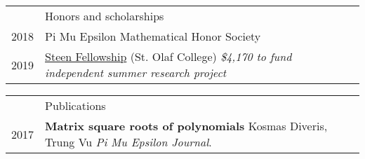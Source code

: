 \documentclass[letterpaper, 11pt]{article}
\newcommand{\headingfont}{\Large\color{Red}}
\newenvironment{SectionTable}[1]{
	\renewcommand*{\arraystretch}{1.7}
	\setlength{\tabcolsep}{10pt}
	\begin{longtable}{Rp{5.2in}} & #1 \\}
	{\end{longtable}\vspace{-.3cm}}
\newenvironment{SectionTableSingleSpace}[1]{
	\renewcommand*{\arraystretch}{1.2}
	\setlength{\tabcolsep}{10pt}
	\begin{longtable}{Rp{5.2in}} & #1 \\[0.6em]}
	{\end{longtable}\vspace{-.3cm}}
\begin{document}
	
	\begin{SectionTableSingleSpace}{\headingfont Honors and scholarships}
		2018 & 
		Pi Mu Epsilon Mathematical Honor Society \\
		
		2019 &
		\href{https://wp.stolaf.edu/curi/summer-undergraduate-research}{Steen Fellowship} (St. Olaf College) \newline 
		\textit{\$4,170  to fund independent summer research project}
		\\
		

	\end{SectionTableSingleSpace}
	
	
	\begin{SectionTable}{\headingfont Publications} 
		2017 & 
		\textbf{Matrix square roots of polynomials} \newline
		Kosmas Diveris, Trung Vu \newline
		\textit{Pi Mu Epsilon Journal}. \\
		
		
		
	\end{SectionTable}
	
	
\end{document}
